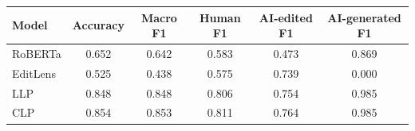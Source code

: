 \begin{tabular}{lccccc}
\toprule
Model & Accuracy & Macro F1 & Human F1 & AI-edited F1 & AI-generated F1 \\
\midrule
RoBERTa & 0.652 & 0.642 & 0.583 & 0.473 & 0.869 \\
EditLens & 0.525 & 0.438 & 0.575 & 0.739 & 0.000 \\
LLP & 0.848 & 0.848 & 0.806 & 0.754 & 0.985 \\
CLP & 0.854 & 0.853 & 0.811 & 0.764 & 0.985 \\
\bottomrule
\end{tabular}
